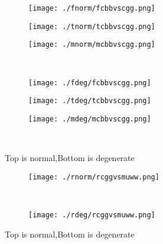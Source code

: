 \documentclass[aps,floats,floatfix,nofootinbib]{revtex4-1}
\begin{document}
\begin{center}
\begin{figure}
\begin{subfigure}{0.3\textwidth}
\texttt{[image: ./fnorm/fcbbvscgg.png]}
\label{}
\end{subfigure}
\begin{subfigure}{0.3\textwidth}
\texttt{[image: ./tnorm/tcbbvscgg.png]}
\label{}
\end{subfigure}
\begin{subfigure}{0.3\textwidth}
\texttt{[image: ./mnorm/mcbbvscgg.png]}
\label{}
\end{subfigure}\\
\begin{subfigure}{0.3\textwidth}
\texttt{[image: ./fdeg/fcbbvscgg.png]}
\label{}
\end{subfigure}
\begin{subfigure}{0.3\textwidth}
\texttt{[image: ./tdeg/tcbbvscgg.png]}
\label{}
\end{subfigure}
\begin{subfigure}{0.3\textwidth}
\texttt{[image: ./mdeg/mcbbvscgg.png]}
\label{}
\end{subfigure}\\
\caption{Top is normal,Bottom is degenerate}
\end{figure}
\end{center}

\begin{center}
\begin{figure}
\begin{subfigure}{0.95\textwidth}
\texttt{[image: ./rnorm/rcggvsmuww.png]}
\label{}
\end{subfigure}\\
\begin{subfigure}{0.95\textwidth}
\texttt{[image: ./rdeg/rcggvsmuww.png]}
\label{}
\end{subfigure}
\caption{Top is normal,Bottom is degenerate}
\end{figure}
\end{center}
\end{document}
